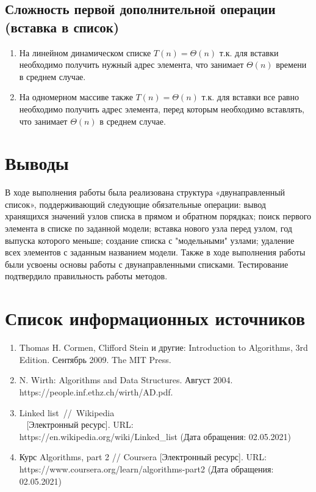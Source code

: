 \documentclass[a4paper, 14pt]{extarticle}
\begin{document}
\subsection{Сложность первой дополнительной операции (вставка в список)}
\begin{enumerate}
  \item На линейном динамическом списке $T(n)=\Theta(n)$ т.к. для вставки
    необходимо получить нужный адрес элемента, что занимает  $\Theta(n)$ времени
    в среднем случае. 
  \item На одномерном массиве также $T(n)=\Theta(n)$ т.к. для вставки все равно
    необходимо получить адрес элемента, перед которым необходимо вставлять,
    что занимает  $\Theta(n)$ в среднем случае.
\end{enumerate}
\newpage
\section*{Выводы}
В ходе выполнения работы была реализована структура
«двунаправленный список», поддерживающий следующие обязательные операции: вывод
хранящихся значений узлов списка в прямом и обратном порядках; поиск первого
элемента в списке по заданной модели; вставка нового узла перед узлом,
год выпуска которого меньше; создание списка с "модельными" узлами;
удаление всех элементов с заданным названием модели. Также в ходе
выполнения работы были усвоены основы работы с двунаправленными списками.
Тестирование подтвердило правильность работы методов.
\section*{Список информационных источников}
\begin{enumerate}[leftmargin=*]
  \item Thomas H. Cormen, Clifford Stein и другие: Introduction to Algorithms, 3rd Edition.
    Сентябрь 2009. The MIT Press.
  \item N. Wirth: Algorithms and Data Structures. Август 2004.
    \\ https://people.inf.ethz.ch/wirth/AD.pdf.
  \item Linked list~//~Wikipedia \\~
    [Электронный ресурс]. URL:
    \\ https://en.wikipedia.org/wiki/Linked\_list
    (Дата обращения: 02.05.2021)
   \item Курс Algorithms, part 2 // Coursera [Электронный ресурс]. URL:
     \\ https://www.coursera.org/learn/algorithms-part2
     (Дата обращения: 02.05.2021)
\end{enumerate}
\end{document}
